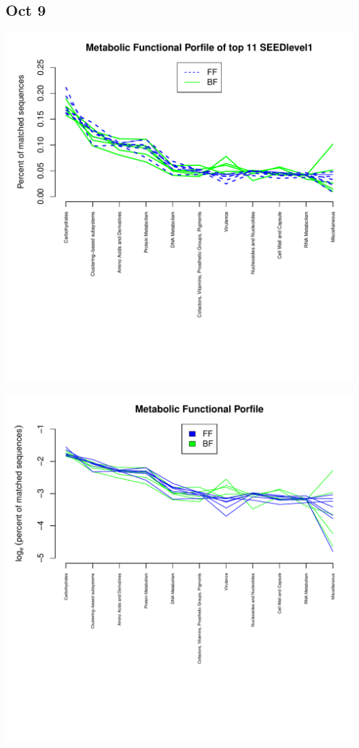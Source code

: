 \documentclass{article}\usepackage[]{graphicx}\usepackage[]{color}
\makeatletter
\def\maxwidth{ %
  \ifdim\Gin@nat@width>\linewidth
    \linewidth
  \else
    \Gin@nat@width
  \fi
}
\makeatother
\begin{document}
  \subsection{Oct 9}
   \begin{center}
\begin{Schunk}


{\centering \includegraphics[width=\maxwidth]{figure/Oct_9-1} 

}



{\centering \includegraphics[width=\maxwidth]{figure/Oct_9-2} 

}
\end{Schunk}
\end{center}
\end{document}
